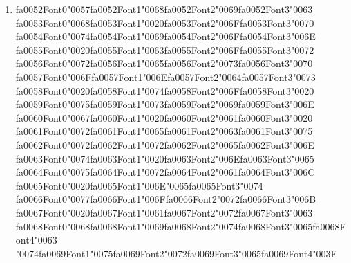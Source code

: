 \documentclass[11pt]{article}
\begin{document}
\begin{enumerate}[label=Q\arabic*., leftmargin=*]
\item {\csname fa0052Font0\endcsname\char"0057}{\csname fa0052Font1\endcsname\char"0068}{\csname fa0052Font2\endcsname\char"0069}{\csname fa0052Font3\endcsname\char"0063} {\csname fa0053Font0\endcsname\char"0068}{\csname fa0053Font1\endcsname\char"0020}{\csname fa0053Font2\endcsname\char"006F}{\csname fa0053Font3\endcsname\char"0070} {\csname fa0054Font0\endcsname\char"0074}{\csname fa0054Font1\endcsname\char"0069}{\csname fa0054Font2\endcsname\char"006F}{\csname fa0054Font3\endcsname\char"006E} {\csname fa0055Font0\endcsname\char"0020}{\csname fa0055Font1\endcsname\char"0063}{\csname fa0055Font2\endcsname\char"006F}{\csname fa0055Font3\endcsname\char"0072} {\csname fa0056Font0\endcsname\char"0072}{\csname fa0056Font1\endcsname\char"0065}{\csname fa0056Font2\endcsname\char"0073}{\csname fa0056Font3\endcsname\char"0070} {\csname fa0057Font0\endcsname\char"006F}{\csname fa0057Font1\endcsname\char"006E}{\csname fa0057Font2\endcsname\char"0064}{\csname fa0057Font3\endcsname\char"0073} {\csname fa0058Font0\endcsname\char"0020}{\csname fa0058Font1\endcsname\char"0074}{\csname fa0058Font2\endcsname\char"006F}{\csname fa0058Font3\endcsname\char"0020} {\csname fa0059Font0\endcsname\char"0075}{\csname fa0059Font1\endcsname\char"0073}{\csname fa0059Font2\endcsname\char"0069}{\csname fa0059Font3\endcsname\char"006E} {\csname fa0060Font0\endcsname\char"0067}{\csname fa0060Font1\endcsname\char"0020}{\csname fa0060Font2\endcsname\char"0061}{\csname fa0060Font3\endcsname\char"0020} {\csname fa0061Font0\endcsname\char"0072}{\csname fa0061Font1\endcsname\char"0065}{\csname fa0061Font2\endcsname\char"0063}{\csname fa0061Font3\endcsname\char"0075} {\csname fa0062Font0\endcsname\char"0072}{\csname fa0062Font1\endcsname\char"0072}{\csname fa0062Font2\endcsname\char"0065}{\csname fa0062Font3\endcsname\char"006E} {\csname fa0063Font0\endcsname\char"0074}{\csname fa0063Font1\endcsname\char"0020}{\csname fa0063Font2\endcsname\char"006E}{\csname fa0063Font3\endcsname\char"0065} {\csname fa0064Font0\endcsname\char"0075}{\csname fa0064Font1\endcsname\char"0072}{\csname fa0064Font2\endcsname\char"0061}{\csname fa0064Font3\endcsname\char"006C} {\csname fa0065Font0\endcsname\char"0020}{\csname fa0065Font1\endcsname\char"006E}{\char"0065}{\csname fa0065Font3\endcsname\char"0074} {\csname fa0066Font0\endcsname\char"0077}{\csname fa0066Font1\endcsname\char"006F}{\csname fa0066Font2\endcsname\char"0072}{\csname fa0066Font3\endcsname\char"006B} {\csname fa0067Font0\endcsname\char"0020}{\csname fa0067Font1\endcsname\char"0061}{\csname fa0067Font2\endcsname\char"0072}{\csname fa0067Font3\endcsname\char"0063} {\csname fa0068Font0\endcsname\char"0068}{\csname fa0068Font1\endcsname\char"0069}{\csname fa0068Font2\endcsname\char"0074}{\csname fa0068Font3\endcsname\char"0065}{\csname fa0068Font4\endcsname\char"0063} {\char"0074}{\csname fa0069Font1\endcsname\char"0075}{\csname fa0069Font2\endcsname\char"0072}{\csname fa0069Font3\endcsname\char"0065}{\csname fa0069Font4\endcsname\char"003F}\\

\end{enumerate}
\end{document}
